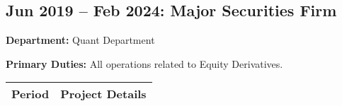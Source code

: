 \documentclass[uplatex,a4j,10.5pt,dvipdfmx]{jsarticle}
\newcommand{\textbfsubsection}[1]{\subsection*{\textbf{#1}}}
\begin{document}
\textbfsubsection{Jun 2019 -- Feb 2024: Major Securities Firm}

\noindent\textbf{Department:} Quant Department

\noindent\textbf{Primary Duties:} All operations related to Equity Derivatives.

\begin{longtable}{|c|p{14cm}|}
	\hline
	\multicolumn{1}{|c|}{\textbf{Period}} & \multicolumn{1}{c|}{\textbf{Project Details}}                                                                                                                                                                                                                                                                                                \\
	\hline
	\endhead


\end{longtable}
\end{document}
